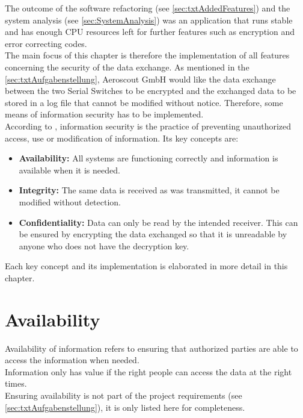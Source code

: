 %
The outcome of the software refactoring (see \autoref{sec:txtAddedFeatures}) and the system analysis (see \autoref{sec:SystemAnalysis}) was an application that runs stable and has enough CPU resources left for further features such as encryption and error correcting codes.\\
The main focus of this chapter is therefore the implementation of all features concerning the security of the data exchange. As mentioned in the \autoref{sec:txtAufgabenstellung}, Aeroscout GmbH would like the data exchange between the two Serial Switches to be encrypted and the exchanged data to be stored in a log file that cannot be modified without notice. Therefore, some means of information security has to be implemented.\\
According to \cite{Security_BuEdu}, information security is the practice of preventing unauthorized access, use or modification of information. Its key concepts are: \begin{itemize}
    \item \textbf{Availability:} All systems are functioning correctly and information is available when it is needed.
    \item \textbf{Integrity:} The same data is received as was transmitted, it cannot be modified without detection.
    \item \textbf{Confidentiality:} Data can only be read by the intended receiver. This can be ensured by encrypting the data exchanged so that it is unreadable by anyone who does not have the decryption key.
\end{itemize}
Each key concept and its implementation is elaborated in more detail in this chapter.
%
%
%
%
%
\section{Availability}
Availability of information refers to ensuring that authorized parties are able to access the information when needed.\\
Information only has value if the right people can access the data at the right times.\\
Ensuring availability is not part of the project requirements (see \autoref{sec:txtAufgabenstellung}), it is only listed here for completeness.
%
%
%
%
%
%
%

